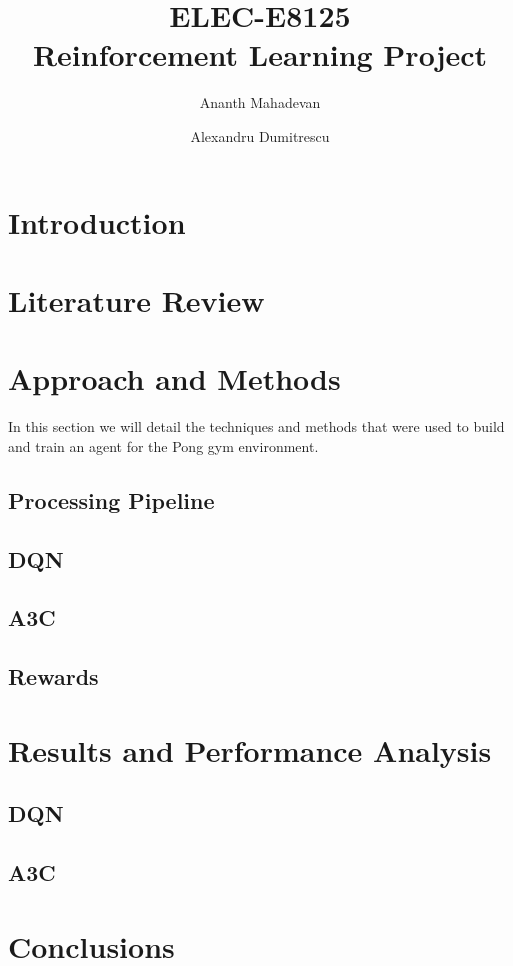 \documentclass{article}
\title{ELEC-E8125 \\
        Reinforcement Learning Project}
\author{  Ananth Mahadevan\\
\and
Alexandru Dumitrescu\\
}
\date{}
\begin{document}
\maketitle
\clearpage
\tableofcontents
\clearpage

\section{Introduction}
\label{sec:introduction}



\section{Literature Review}
\label{sec:external}


\section{Approach and Methods}
\label{sec:methods}
In this section we will detail the techniques and methods that were used to build and train an agent for the Pong gym environment.

\subsection{Processing Pipeline}
\label{subsec:processing}


\subsection{DQN}


\subsection{A3C}


\subsection{Rewards}


\section{Results and Performance Analysis}
\label{sec:results}

\subsection{DQN}

\subsection{A3C}


\section{Conclusions}
\label{sec:conclusion}

\clearpage      
{}

\end{document}
